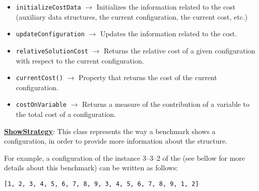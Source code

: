 \begin{itemize}
\item \verb!initializeCostData! $\rightarrow$ Initializes the information related to the cost (auxiliary data structures, the current configuration, the current cost, etc.)
\item \verb!updateConfiguration! $\rightarrow$ Updates the information related to the cost.
\item \verb!relativeSolutionCost! $\rightarrow$ Returns the relative cost of a given configuration with respect to the current configuration.
\item \verb!currentCost()! $\rightarrow$ Property that returns the cost of the current configuration.
\item \verb!costOnVariable! $\rightarrow$ Returns a measure of the contribution of a variable to the total cost of a configuration.
\end{itemize}

\underline{\textbf{ShowStrategy}}: This class represents the way a benchmark shows a configuration, in order to provide more information about the structure. 

For example, a configuration of the instance 3--3--2 of the \sgp{} (see bellow for more details about this benchmark) can be written as follows:

\begin{Verbatim}
[1, 2, 3, 4, 5, 6, 7, 8, 9, 3, 4, 5, 6, 7, 8, 9, 1, 2]
\end{Verbatim}

